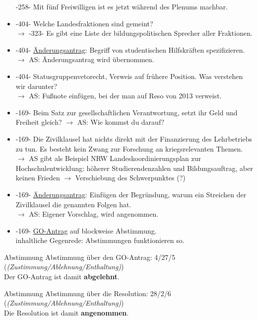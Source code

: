 \begin{itemize}
        -258- Mit fünf Freiwilligen ist es jetzt während des Plenums machbar.
      \item -404- Welche Landesfraktionen sind gemeint? \\
        $\rightarrow$ -323- Es gibt eine Liste der bildungspolitischen Sprecher aller Fraktionen.
      \item -404- \underline{Änderungsantrag}: Begriff von studentischen Hilfskräften spezifizieren.
        $\rightarrow$ AS: Änderungsantrag wird übernommen.
      \item -404- Statusgruppenvetorecht, Verweis auf frühere Position. Was verstehen wir darunter? \\
        $\rightarrow$ AS: Fußnote einfügen, bei der man auf Reso von 2013 verweist.
      \item -169- Beim Satz zur gesellschaftlichen Verantwortung, setzt ihr Geld und Freiheit gleich?
        $\rightarrow$ AS: Wie kommst du darauf?
      \item -169- Die Zivilklausel hat nichts direkt mit der Finanzierung des Lehrbetriebs zu tun. Es besteht kein Zwang zur Forschung an kriegsrelevanten Themen. \\
        $\rightarrow$ AS gibt als Beispiel NRW Landeskoordinierungsplan zur Hochschulentwicklung: höherer Studierendenzahlen und Bildungsauftrag, aber keinen Frieden $\rightarrow$ Verschiebung des Schwerpunktes (?)
      \item -169- \underline{Änderungsantrag}: Einfügen der Begründung, warum ein Streichen der Zivilklausel die genannten Folgen hat. \\
        $\rightarrow$ AS: Eigener Vorschlag, wird angenommen.
      \item -169- \underline{GO-Antrag} auf blockweise Abstimmung. \\
        inhaltliche Gegenrede: Abstimmungen funktionieren so.
    \end{itemize}

    \begin{danger}{Abstimmung}
      Abstimmung über den GO-Antrag: 4/27/5 (\textit{(Zustimmung/Ablehnung/Enthaltung)}) \\
      Der GO-Antrag ist damit \textbf{abgelehnt}.
    \end{danger}

    \begin{success}{Abstimmung}
      Abstimmung über die Resolution: 28/2/6 (\textit{(Zustimmung/Ablehnung/Enthaltung)}) \\
      Die Resolution ist damit \textbf{angenommen}.
    \end{success}

